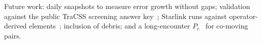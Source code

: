 \documentclass[conference]{IEEEtran}
\begin{document}
Future work: daily snapshots to measure error growth without gaps; validation against the public TraCSS screening answer key~\cite{auman2025}; Starlink runs against operator-derived elements~\cite{celestrak_supgp}; inclusion of debris; and a long-encounter $P_c$~\cite{coppola2012} for co-moving pairs.



\end{document}
